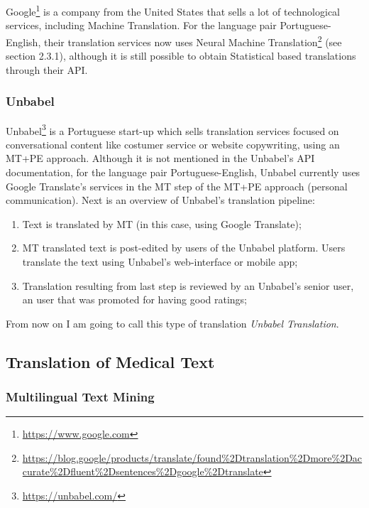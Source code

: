 Google\footnote{\url{https://www.google.com}} is a company from the United States that sells a lot of technological services, including Machine Translation. For the language pair Portuguese-English, their translation services now uses Neural Machine Translation\footnote{\url{https://blog.google/products/translate/found\%2Dtranslation\%2Dmore\%2Daccurate\%2Dfluent\%2Dsentences\%2Dgoogle\%2Dtranslate}} (see section 2.3.1), although it is still possible to obtain Statistical based translations through their API.

\subsubsection{Unbabel}

Unbabel\footnote{\url{https://unbabel.com/}} is a Portuguese start-up which sells translation services focused on conversational content like costumer service or website copywriting, using an MT+PE approach. Although it is not mentioned in the Unbabel's API documentation, for the language pair Portuguese-English, Unbabel currently uses Google Translate's services in the MT step of the MT+PE approach (personal communication). Next is an overview of Unbabel's translation pipeline:

\begin{enumerate}
\item Text is translated by MT (in this case, using Google Translate);
\item MT translated text is post-edited by users of the Unbabel platform. Users translate the text using Unbabel's web-interface or mobile app;
\item Translation resulting from last step is reviewed by an Unbabel's senior user, an user that was promoted for having good ratings;
\end{enumerate}

From now on I am going to call this type of translation \textit{Unbabel Translation}.


\subsection{Translation of Medical Text}

\subsubsection{Multilingual Text Mining}
\label{multilingual-text-mining}


